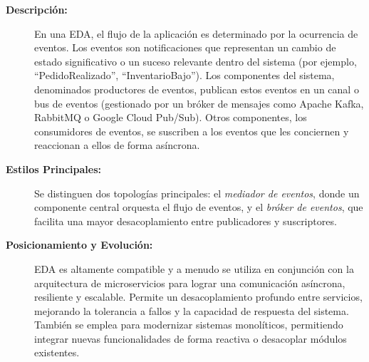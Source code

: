 \begin{description}
    \item[\textbf{Descripción:}] En una EDA, el flujo de la aplicación es determinado por la ocurrencia de eventos. Los eventos son notificaciones que representan un cambio de estado significativo o un suceso relevante dentro del sistema (por ejemplo, ``PedidoRealizado'', ``InventarioBajo''). Los componentes del sistema, denominados productores de eventos, publican estos eventos en un canal o bus de eventos (gestionado por un bróker de mensajes como Apache Kafka, RabbitMQ o Google Cloud Pub/Sub). Otros componentes, los consumidores de eventos, se suscriben a los eventos que les conciernen y reaccionan a ellos de forma asíncrona.
    \item[\textbf{Estilos Principales:}] Se distinguen dos topologías principales: el \textit{mediador de eventos}, donde un componente central orquesta el flujo de eventos, y el \textit{bróker de eventos}, que facilita una mayor desacoplamiento entre publicadores y suscriptores.
    \item[\textbf{Posicionamiento y Evolución:}] EDA es altamente compatible y a menudo se utiliza en conjunción con la arquitectura de microservicios para lograr una comunicación asíncrona, resiliente y escalable. Permite un desacoplamiento profundo entre servicios, mejorando la tolerancia a fallos y la capacidad de respuesta del sistema. También se emplea para modernizar sistemas monolíticos, permitiendo integrar nuevas funcionalidades de forma reactiva o desacoplar módulos existentes.
\end{description}


